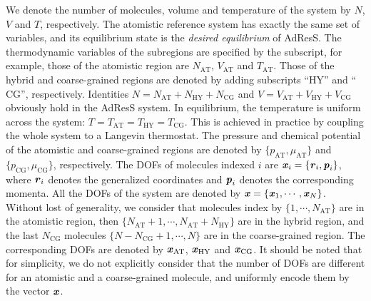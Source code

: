 \documentclass[epjST]{svjour}
\newcommand{\redc}[1]{{\color{red} #1}}
\newcommand{\vect}[1]{\textbf{\textit{#1}}}
\newcommand{\AT}[0]{\textrm{AT}}
\newcommand{\HY}[0]{\textrm{HY}}
\newcommand{\CG}[0]{\textrm{CG}}
\newcommand{\moleidxone}[0]{i}
\begin{document}
We denote the number of molecules, volume and temperature of the system by $N$, $V$ and $T$, respectively.
The atomistic reference system has exactly the same set of variables, and its equilibrium state  is
the \emph{desired equilibrium} of AdResS.
The thermodynamic variables of the subregions are specified by the subscript,
for example, those of the atomistic region are 
$N_\AT$, $V_\AT$ and $T_\AT$. Those of the hybrid and coarse-grained regions
are denoted by adding subscripts ``$\HY$'' and ``$\CG$'', respectively.
Identities $N = N_\AT + N_\HY + N_\CG$ and $V = V_\AT + V_\HY + V_\CG$ obviously hold
in the AdResS system.
In equilibrium, the temperature is uniform across the system: $T = T_\AT = T_\HY = T_\CG$.
This is achieved in practice by coupling the whole system to a Langevin thermostat.
The pressure and chemical potential of the atomistic and coarse-grained regions
are denoted by $\{p_\AT, \mu_\AT\}$
and $\{p_\CG, \mu_\CG\}$, respectively.
The DOFs of molecules indexed $\moleidxone$ are $\vect x_\moleidxone = \{\vect r_\moleidxone, \vect p_\moleidxone\}$, where
$\vect r_\moleidxone$ denotes the generalized coordinates and $\vect p_\moleidxone$ denotes the corresponding momenta.
All the DOFs of the system are denoted by $\vect x = \{\vect x_1, \cdots, \vect x_N\}$. Without lost of
generality, we consider that molecules index by $\{1, \cdots, N_\AT\}$ are in the atomistic region, then $\{N_\AT+1, \cdots, N_\AT + N_\HY\}$ are in the hybrid region, and
the last $N_\CG$ molecules $\{N-N_\CG+1, \cdots, N\}$ are in the coarse-grained region. The corresponding DOFs are denoted by $\vect x_\AT$, $\vect x_\HY$ and $\vect x_\CG$.
It should be noted that for simplicity, we do not explicitly consider that the number of DOFs are different for an atomistic
and a coarse-grained molecule, and uniformly encode them by the vector $\vect x$.

\end{document}
